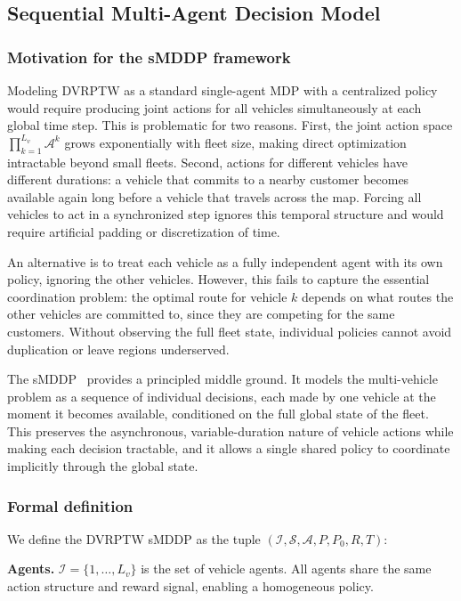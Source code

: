 \documentclass[conference]{IEEEtran}
\begin{document}
\subsection{Sequential Multi-Agent Decision Model}
\label{sec:prob_mdp}

\subsubsection{Motivation for the sMDDP framework}
Modeling DVRPTW as a standard single-agent MDP with a centralized policy would require producing joint actions for all vehicles simultaneously at each global time step.
This is problematic for two reasons.
First, the joint action space $\prod_{k=1}^{L_v} \mathcal{A}^k$ grows exponentially with fleet size, making direct optimization intractable beyond small fleets.
Second, actions for different vehicles have different durations: a vehicle that commits to a nearby customer becomes available again long before a vehicle that travels across the map.
Forcing all vehicles to act in a synchronized step ignores this temporal structure and would require artificial padding or discretization of time.

An alternative is to treat each vehicle as a fully independent agent with its own policy, ignoring the other vehicles.
However, this fails to capture the essential coordination problem: the optimal route for vehicle $k$ depends on what routes the other vehicles are committed to, since they are competing for the same customers.
Without observing the full fleet state, individual policies cannot avoid duplication or leave regions underserved.

The sMDDP~\cite{TAM2026114234} provides a principled middle ground.
It models the multi-vehicle problem as a sequence of individual decisions, each made by one vehicle at the moment it becomes available, conditioned on the full global state of the fleet.
This preserves the asynchronous, variable-duration nature of vehicle actions while making each decision tractable, and it allows a single shared policy to coordinate implicitly through the global state.

\subsubsection{Formal definition}
We define the DVRPTW sMDDP as the tuple $(\mathcal{I}, \mathcal{S}, \mathcal{A}, P, P_0, R, T)$:

\smallskip\noindent\textbf{Agents.}
$\mathcal{I} = \{1, \ldots, L_v\}$ is the set of vehicle agents.
All agents share the same action structure and reward signal, enabling a homogeneous policy.
\end{document}
